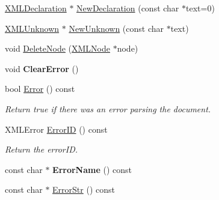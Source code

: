 \begin{DoxyCompactItemize}
\item 
\mbox{\hyperlink{classtinyxml2_1_1XMLDeclaration}{X\+M\+L\+Declaration}} $\ast$ \mbox{\hyperlink{classtinyxml2_1_1XMLDocument_aee2eb3435923f5494dcc70ac225b60a2}{New\+Declaration}} (const char $\ast$text=0)
\item 
\mbox{\hyperlink{classtinyxml2_1_1XMLUnknown}{X\+M\+L\+Unknown}} $\ast$ \mbox{\hyperlink{classtinyxml2_1_1XMLDocument_a5385c937734ff6db9226ab707d2c7147}{New\+Unknown}} (const char $\ast$text)
\item 
void \mbox{\hyperlink{classtinyxml2_1_1XMLDocument_ac1d6e2c7fcc1a660624ac4f68e96380d}{Delete\+Node}} (\mbox{\hyperlink{classtinyxml2_1_1XMLNode}{X\+M\+L\+Node}} $\ast$node)
\item 
\mbox{\label{classtinyxml2_1_1XMLDocument_a4085d9c52f1d93214311459d6d1fcf17}} 
void {\bfseries Clear\+Error} ()
\item 
\mbox{\label{classtinyxml2_1_1XMLDocument_a34e6318e182e40e3cc4f4ba5d59ed9ed}} 
bool \mbox{\hyperlink{classtinyxml2_1_1XMLDocument_a34e6318e182e40e3cc4f4ba5d59ed9ed}{Error}} () const
\begin{DoxyCompactList}\small\item\em Return true if there was an error parsing the document. \end{DoxyCompactList}\item 
\mbox{\label{classtinyxml2_1_1XMLDocument_afa3ed33b3107f920ec2b301f805ac17d}} 
X\+M\+L\+Error \mbox{\hyperlink{classtinyxml2_1_1XMLDocument_afa3ed33b3107f920ec2b301f805ac17d}{Error\+ID}} () const
\begin{DoxyCompactList}\small\item\em Return the error\+ID. \end{DoxyCompactList}\item 
\mbox{\label{classtinyxml2_1_1XMLDocument_ac75d2de15c78497eadb4245b9a9862c7}} 
const char $\ast$ {\bfseries Error\+Name} () const
\item 
const char $\ast$ \mbox{\hyperlink{classtinyxml2_1_1XMLDocument_ad75aa9d32c4e8b300655186808aa9abf}{Error\+Str}} () const
\item 
\mbox{\label{classtinyxml2_1_1XMLDocument_a1d033945b42e125d933d6231e4571552}} 

\end{DoxyCompactItemize}
